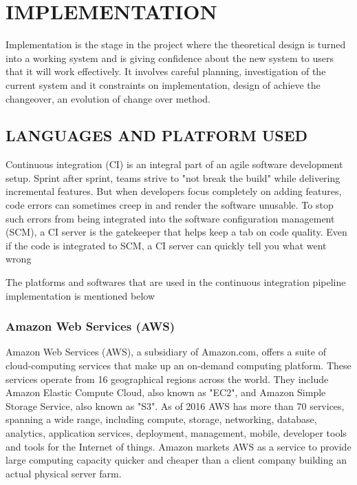 \documentclass[12pt,a4paper,oneside]{report}
\begin{document}
{\chapter{IMPLEMENTATION}
Implementation is the stage in the project where the theoretical design is turned into a working system and is giving confidence about the new system to users that it will work effectively. It involves careful planning, investigation of the current system and it constraints on implementation, design of achieve the changeover, an evolution of change over method.

\section{LANGUAGES AND PLATFORM USED}
\par Continuous integration (CI) is an integral part of an agile software development setup. Sprint after sprint, teams strive to "not break the build" while delivering incremental features. But when developers focus completely on adding features, code errors can sometimes creep in and render the software unusable. To stop such errors from being integrated into the software configuration management (SCM), a CI server is the gatekeeper that helps keep a tab on code quality. Even if the code is integrated to SCM, a CI server can quickly tell you what went wrong
\par
	The platforms and softwares that are used in the continuous integration pipeline implementation is mentioned below 
\subsection{Amazon Web Services (AWS)}
\par Amazon Web Services (AWS), a subsidiary of Amazon.com, offers a suite of cloud-computing services that make up an on-demand computing platform. These services operate from 16 geographical regions across the world. They include Amazon Elastic Compute Cloud, also known as "EC2", and Amazon Simple Storage Service, also known as "S3". As of 2016 AWS has more than 70 services, spanning a wide range, including compute, storage, networking, database, analytics, application services, deployment, management, mobile, developer tools and tools for the Internet of things. Amazon markets AWS as a service to provide large computing capacity quicker and cheaper than a client company building an actual physical server farm.\\
}
\end{document}

